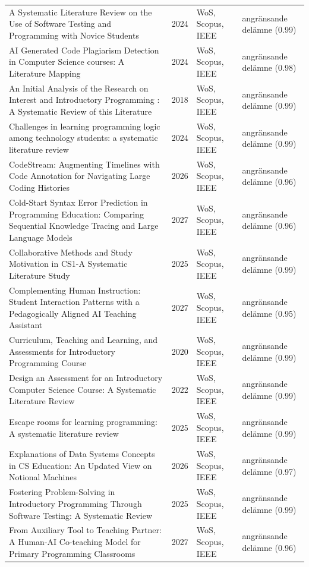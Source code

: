\begin{longtable}{@{}%
  >{\raggedright\arraybackslash}p{}c%
  >{\raggedright\arraybackslash}p{}%
  >{\raggedright\arraybackslash}p{}@{}}
A Systematic Literature Review on the Use of Software Testing and Programming with Novice Students & 2024 & WoS, Scopus, IEEE & angränsande delämne (0.99) \\
AI Generated Code Plagiarism Detection in Computer Science courses: A Literature Mapping & 2024 & WoS, Scopus, IEEE & angränsande delämne (0.98) \\
An Initial Analysis of the Research on Interest and Introductory Programming : A Systematic Review of this Literature & 2018 & WoS, Scopus, IEEE & angränsande delämne (0.99) \\
Challenges in learning programming logic among technology students: a systematic literature review & 2024 & WoS, Scopus, IEEE & angränsande delämne (0.99) \\
CodeStream: Augmenting Timelines with Code Annotation for Navigating Large Coding Histories & 2026 & WoS, Scopus, IEEE & angränsande delämne (0.96) \\
Cold-Start Syntax Error Prediction in Programming Education: Comparing Sequential Knowledge Tracing and Large Language Models & 2027 & WoS, Scopus, IEEE & angränsande delämne (0.96) \\
Collaborative Methods and Study Motivation in CS1-A Systematic Literature Study & 2025 & WoS, Scopus, IEEE & angränsande delämne (0.99) \\
Complementing Human Instruction: Student Interaction Patterns with a Pedagogically Aligned AI Teaching Assistant & 2027 & WoS, Scopus, IEEE & angränsande delämne (0.95) \\
Curriculum, Teaching and Learning, and Assessments for Introductory Programming Course & 2020 & WoS, Scopus, IEEE & angränsande delämne (0.99) \\
Design an Assessment for an Introductory Computer Science Course: A Systematic Literature Review & 2022 & WoS, Scopus, IEEE & angränsande delämne (0.99) \\
Escape rooms for learning programming: A systematic literature review & 2025 & WoS, Scopus, IEEE & angränsande delämne (0.99) \\
Explanations of Data Systems Concepts in CS Education: An Updated View on Notional Machines & 2026 & WoS, Scopus, IEEE & angränsande delämne (0.97) \\
Fostering Problem-Solving in Introductory Programming Through Software Testing: A Systematic Review & 2025 & WoS, Scopus, IEEE & angränsande delämne (0.99) \\
From Auxiliary Tool to Teaching Partner: A Human-AI Co-teaching Model for Primary Programming Classrooms & 2027 & WoS, Scopus, IEEE & angränsande delämne (0.96) \\

\end{longtable}
